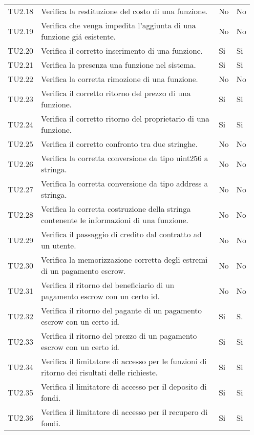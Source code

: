 \begin{longtable}{
		>{\centering}p{}
		>{}p{}
		>{\centering}p{}
		>{\centering}p{} }
TU2.18  &  Verifica la restituzione del costo di una funzione. &
No & No \tabularnewline

TU2.19  &  Verifica che venga impedita l'aggiunta di una funzione giá esistente. &
No & No \tabularnewline

TU2.20  &  Verifica il corretto inserimento di una funzione. &%
Si & Si \tabularnewline

TU2.21  &  Verifica la presenza una funzione nel sistema.	&
Si & Si \tabularnewline

TU2.22  &  Verifica la corretta rimozione di una funzione. &
No & No \tabularnewline

TU2.23  &  Verifica il corretto ritorno del prezzo di una funzione. &
Si & Si \tabularnewline

TU2.24  &  Verifica il corretto ritorno del proprietario di una funzione. &
Si & Si \tabularnewline

TU2.25  &  Verifica il corretto confronto tra due stringhe. &
No & No \tabularnewline

TU2.26  &  Verifica la corretta conversione da tipo uint256 a stringa. &
No & No \tabularnewline

TU2.27  &  Verifica la corretta conversione da tipo address a stringa. &
No & No \tabularnewline

TU2.28  &  Verifica la corretta costruzione della stringa contenente le informazioni di una funzione. &
No & No \tabularnewline

TU2.29  &  Verifica il passaggio di credito dal contratto ad un utente. & %
No & No \tabularnewline

TU2.30  &  Verifica la memorizzazione corretta degli estremi di un pagamento escrow. &
No & No \tabularnewline

TU2.31  &  Verifica il ritorno del beneficiario di un pagamento escrow con un certo id. &
No & No \tabularnewline

TU2.32  &  Verifica il ritorno del pagante di un pagamento escrow con un certo id.  &
Si & S. \tabularnewline

TU2.33  &  Verifica il ritorno del prezzo di un pagamento escrow con un certo id.  &
Si & Si \tabularnewline

TU2.34  &  Verifica il limitatore di accesso per le funzioni di ritorno dei risultati delle richieste.	&
Si & Si \tabularnewline

TU2.35  &  Verifica il limitatore di accesso per il deposito di fondi.	&
Si & Si \tabularnewline

TU2.36  &  Verifica il limitatore di accesso per il recupero di fondi.	&
Si & Si \tabularnewline



\end{longtable}

